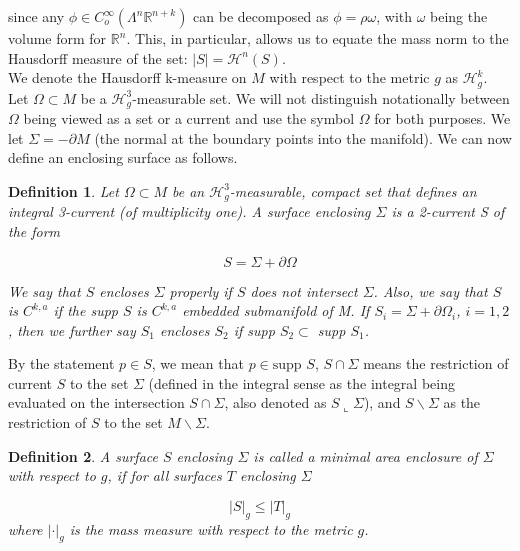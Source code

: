 \documentclass{amsart}
\newcommand{\hm}{\mathscr{H}}
\newtheorem{definition}{Definition}
\theoremstyle{named}
\begin{document}
since any $\phi \in C_{o}^{\infty}(\Lambda^n \mathbb{R}^{n+k})$ can be decomposed as $\phi = \rho \omega$, with $\omega$ being the volume form for $\mathbb{R}^n$. This, in particular, allows us to equate the mass norm to the Hausdorff measure of the set: $|S| = \hm^n(S)$. \\

We denote the Hausdorff k-measure on $M$ with respect to the metric $g$ as $\hm^k_g$. Let $\Omega \subset M$ be a $\hm^3_g$-measurable set. We will not distinguish notationally between $\Omega$ being viewed as a set or a current and use the symbol $\Omega$ for both purposes. We let $\Sigma = -\partial M$ (the normal at the boundary points into the manifold). We can now define an enclosing surface as follows.

\begin{definition}
    Let $\Omega \subset M$ be an $\hm^3_g$-measurable, compact set that defines an integral 3-current (of multiplicity one). A surface enclosing $\Sigma$ is a 2-current S of the form

    \begin{equation*}
        S = \Sigma + \partial \Omega
    \end{equation*}

    We say that $S$ encloses $\Sigma$ properly if $S$ does not intersect $\Sigma$. Also, we say that $S$ is $C^{k,a}$ if the supp $S$ is $C^{k,a}$ embedded submanifold of M. If $S_i = \Sigma + \partial \Omega_i$, $i = 1,2$, then we further say $S_1$ encloses $S_2$ if supp $S_2 \subset$ supp $S_1$.
\end{definition}

By the statement $p \in S$, we mean that $p \in \text{supp } S$, $S \cap \Sigma$ means the restriction of current $S$ to the set $\Sigma$ (defined in the integral sense as the integral being evaluated on the intersection $S \cap \Sigma$, also denoted as $S \llcorner \Sigma$), and $S \backslash \Sigma$ as the restriction of $S$ to the set $M \backslash \Sigma$.

\begin{definition}
    A surface $S$ enclosing $\Sigma$ is called a minimal area enclosure of $\Sigma$ with respect to $g$, if for all surfaces $T$ enclosing $\Sigma$

    \begin{equation*}
        |S|_g \leq |T|_g
    \end{equation*}
    where $| \cdot |_g$ is the mass measure with respect to the metric $g$.
\end{definition}
\end{document}
